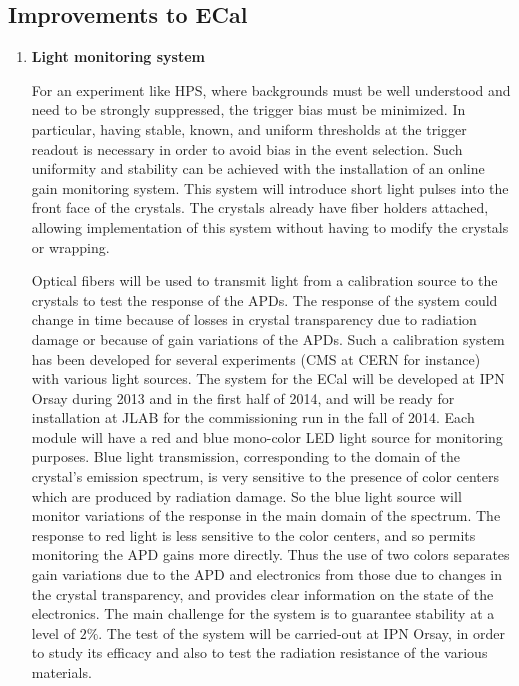 \subsection{Improvements to ECal}

\begin{enumerate}
\item {\bf Light monitoring system}

For an experiment like HPS, where backgrounds must be well understood and need to be strongly suppressed, the trigger bias must be minimized. In particular, having stable, known, and uniform thresholds at the trigger readout is necessary in order to avoid  bias in the 
event selection. Such uniformity and stability can be achieved with the installation of an online gain monitoring 
system. This system will introduce short light pulses into the front face of the crystals. The crystals already have fiber holders attached, allowing implementation of this system without having to modify the crystals or wrapping. 

Optical fibers will be used to transmit light from a calibration  source to the crystals to test the response of the APDs. The response of the system could change in time because of 
losses in crystal transparency due to radiation damage or because of gain variations of the APDs. 
Such a calibration system has been developed for several experiments (CMS at CERN for instance) with various light sources. The system for the ECal 
will be developed at IPN Orsay during 2013 and in the first half of 2014, and will be ready for installation at JLAB for the commissioning run in the fall of 2014. Each module will have a red and blue mono-color LED light source for monitoring purposes. 
Blue light transmission, corresponding to the domain of the crystal's emission spectrum, is very sensitive to the presence of color centers which are produced by radiation damage. So the blue light source will monitor variations of the response in the main domain of the spectrum.
The response to red light is less sensitive to the color centers,  and so permits monitoring the APD gains more directly. Thus the use of two colors separates gain variations due to the 
APD and electronics from those due to changes in the crystal transparency, and provides clear information on the state of the electronics. 
The main challenge for the system is to guarantee stability at a level of $2\%$. The test of the system will be carried-out at
IPN Orsay, in order to study its efficacy and also to test the radiation resistance of the various materials.


\end{enumerate}
